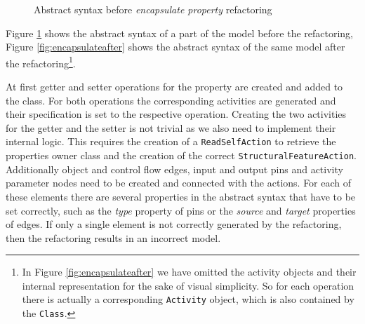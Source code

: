 \documentclass{llncs}
\begin{document}
\begin{figure}
 \caption{Abstract syntax before \textit{encapsulate property} refactoring}
 \label{fig:encapsulatebefore}
\end{figure}

Figure \ref{fig:encapsulatebefore} shows the abstract syntax of a part of the model before the refactoring, 
Figure \ref{fig:encapsulateafter} shows the abstract syntax of the same model after the refactoring\footnote{
In Figure \ref{fig:encapsulateafter} 
we have omitted the activity objects and their internal representation for the sake of visual simplicity. So for each operation 
there is actually a corresponding \texttt{Activity} object, which is also contained by the \texttt{Class}.}.

At first 
getter and setter operations for the property are created and
added to the class. For both operations the corresponding activities are generated and their specification is set to the 
respective operation.
Creating the two activities for the getter and the setter is not trivial as we also need to implement their internal logic. This requires 
the creation of
a \texttt{Read\-Self\-Action} to retrieve the properties owner class and the creation of the correct \texttt{Structural\-Feature\-Action}.
Additionally object and control flow edges, input and output pins and activity parameter nodes need to be created and connected with the 
actions. For each of these elements there are several properties in the abstract syntax that have to be set correctly, such as the 
\textit{type} property of pins or the \textit{source} and \textit{target} properties of edges. If only a single element is not correctly 
generated by the refactoring, then the refactoring results in an incorrect model.
\end{document}
